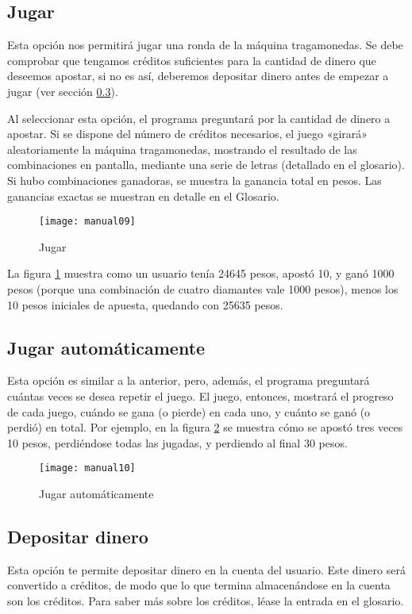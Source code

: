 \documentclass[titlepage,letterpaper,12pt]{article}
\begin{document}
\subsection{Jugar}
Esta opción nos permitirá jugar una ronda de la máquina tragamonedas. Se debe comprobar que tengamos créditos suficientes para la cantidad de dinero que deseemos apostar, si no es así, deberemos depositar dinero antes de empezar a jugar (ver sección \ref{deposito}).

Al seleccionar esta opción, el programa preguntará por la cantidad de dinero a apostar. Si se dispone del número de créditos necesarios, el juego «girará» aleatoriamente la máquina tragamonedas, mostrando el resultado de las combinaciones en pantalla, mediante una serie de letras (detallado en el glosario). Si hubo combinaciones ganadoras, se muestra la ganancia total en pesos. Las ganancias exactas se muestran en detalle en el Glosario.

\begin{figure}
  \centering
  \texttt{[image: manual09]}
  \vspace{-1cm}
  \caption{Jugar}
  \label{fig:m9}
\end{figure}

La figura \ref{fig:m9} muestra como un usuario tenía 24645 pesos, apostó 10, y ganó 1000 pesos (porque una combinación de cuatro diamantes vale 1000 pesos), menos los 10 pesos iniciales de apuesta, quedando con 25635 pesos.

\subsection{Jugar automáticamente}
Esta opción es similar a la anterior, pero, además, el programa preguntará cuántas veces se desea repetir el juego. El juego, entonces, mostrará el progreso de cada juego, cuándo se gana (o pierde) en cada uno, y cuánto se ganó (o perdió) en total. Por ejemplo, en la figura \ref{fig:m10} se muestra cómo se apostó tres veces 10 pesos, perdiéndose todas las jugadas, y perdiendo al final 30 pesos.

\begin{figure}
  \centering
  \texttt{[image: manual10]}
  \vspace{-1cm}
  \caption{Jugar automáticamente}
  \label{fig:m10}
\end{figure}

\subsection{Depositar dinero}
\label{deposito}
Esta opción te permite depositar dinero en la cuenta del usuario. Este dinero será convertido a créditos, de modo que lo que termina almacenándose en la cuenta son los créditos. Para saber más sobre los créditos, léase la entrada en el glosario.
\end{document}
